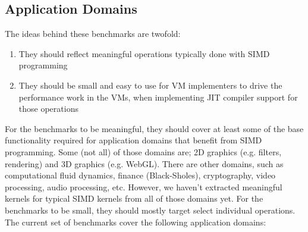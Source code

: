 \documentclass[preprint]{sigplanconf}
\begin{document}
\subsection{Application Domains}
%
The ideas behind these benchmarks are twofold:
%
\begin{enumerate}
\item
They should reflect meaningful operations typically done with SIMD programming
\item
They should be small and easy to use for VM implementers to drive the
performance work in the VMs, when implementing JIT compiler support for those
operations
\end{enumerate}
%
For the benchmarks to be meaningful, they should cover at least some of the base
functionality required for application domains that benefit from SIMD
programming. Some (not all) of those domains are; 2D graphics
(e.g. filters, rendering) and 3D graphics (e.g. WebGL).  There are other
domains, such as computational fluid dynamics, finance (Black-Sholes),
cryptography, video processing, audio processing, etc. However, we haven't
extracted meaningful kernels for typical SIMD kernels from all of those domains
yet.
%
For the benchmarks to be small, they should mostly target select individual
operations.
%
The current set of benchmarks cover the following application domains:
\end{document}
